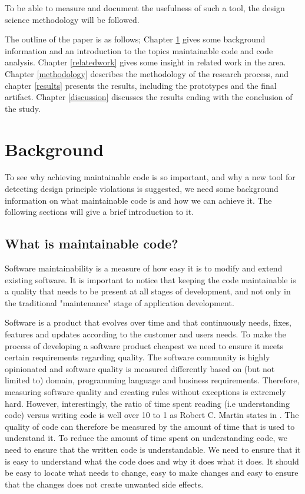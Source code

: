 \documentclass{report}
\begin{document}
To be able to measure and document the usefulness of such a tool, the design science methodology will be followed.


The outline of the paper is as follows; Chapter \ref{background} gives some background information and an introduction to the topics maintainable code and code analysis. Chapter \ref{relatedwork} gives some insight in related work in the area. Chapter \ref{methodology} describes the methodology of the research process, and chapter \ref{results} presents the results, including the prototypes and the final artifact. Chapter \ref{discussion} discusses the results ending with the conclusion of the study.  

\chapter{Background}

\label{background}
To see why achieving maintainable code is so important, and why a new tool for detecting design principle violations is suggested, we need some background information on what maintainable code is and how we can achieve it. The following sections will give a brief introduction to it.

\section{What is maintainable code?}
Software maintainability is a measure of how easy it is to modify and extend existing software. It is important to notice that keeping the code maintainable is a quality that needs to be present at all stages of development, and not only in the traditional "maintenance" stage of application development.  

Software is a product that evolves over time and that continuously needs, fixes, features and updates according to the customer and users needs. To make the process of developing a software product cheapest we need to ensure it meets certain requirements regarding quality. The software community is highly opinionated and software quality is measured differently based on (but not limited to) domain, programming language and business requirements. Therefore, measuring software quality and creating rules without exceptions is extremely hard. However, interestingly, the ratio of time spent reading (i.e understanding code) versus writing code is well over 10 to 1 as Robert C. Martin states in \cite{Martin:2008:CCH:1388398}. The quality of code can therefore be measured by the amount of time that is used to understand it. To reduce the amount of time spent on understanding code, we need to ensure that the written code is understandable. We need to ensure that it is easy to understand what the code does and why it does what it does. It should be easy to locate what needs to change, easy to make changes and easy to ensure that the changes does not create unwanted side effects. \hfill 
\hfill \newline
\end{document}

